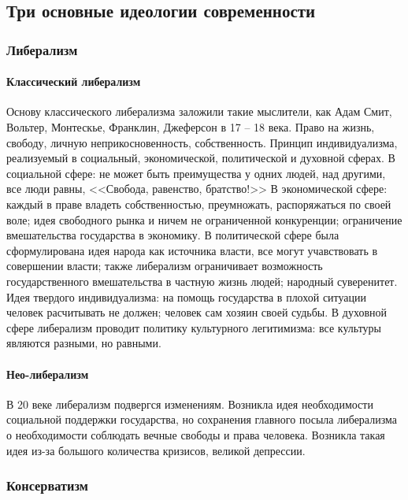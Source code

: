 \documentclass[12pt]{article}
\begin{document}
	\subsection{Три основные идеологии современности}
	\subsubsection{Либерализм}
	\paragraph{Классический либерализм}
	\begin{note}
		Основу классического либерализма заложили такие мыслители, как Адам Смит, Вольтер, Монтескье, Франклин, Джеферсон в 17 -- 18 века. Право на жизнь, свободу, личную неприкосновенность, собственность. Принцип индивидуализма, реализуемый в социальный, экономической, политической и духовной сферах. В социальной сфере: не может быть преимущества у одних людей, над другими, все люди равны, <<Свобода, равенство, братство!>> В экономической сфере: каждый в праве владеть собственностью, преумножать, распоряжаться по своей воле; идея свободного рынка и ничем не ограниченной конкуренции; ограничение вмешательства государства в экономику. В политической сфере была сформулирована идея народа как источника власти, все могут учавствовать в совершении власти; также либерализм ограничивает возможность государственного вмешательства в частную жизнь людей; народный суверенитет. Идея твердого индивидуализма: на помощь государства в плохой ситуации человек расчитывать не должен; человек сам хозяин своей судьбы. В духовной сфере либерализм проводит политику культурного легитимизма: все культуры являются разными, но равными.
	\end{note}
	\paragraph{Нео-либерализм}
	\begin{definition}
		В 20 веке либерализм подвергся изменениям. Возникла идея необходимости социальной поддержки государства, но сохранения главного посыла либерализма о необходимости соблюдать вечные свободы и права человека. Возникла такая идея из-за большого количества кризисов, великой депрессии.
	\end{definition}
	\subsubsection{Консерватизм}
\end{document}
